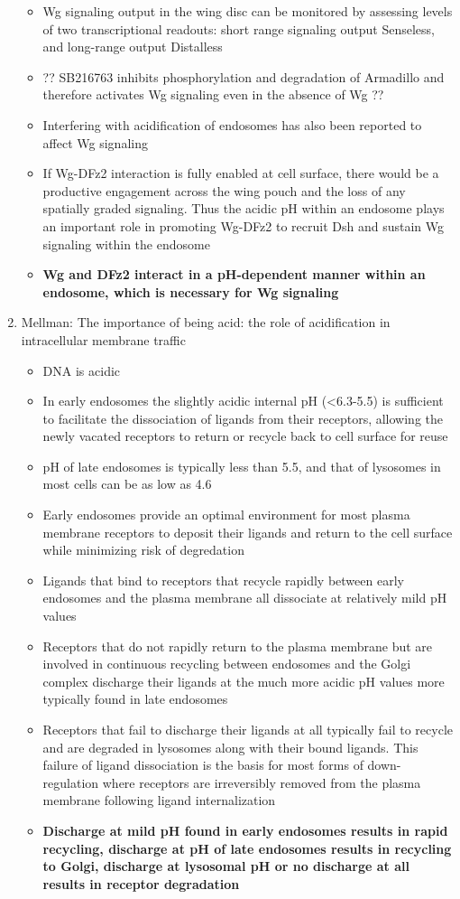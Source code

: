\documentclass[12pt]{article}
\begin{document}
\begin{enumerate}
\begin{itemize}
	\item Wg signaling output in the wing disc can be monitored by assessing levels of two transcriptional readouts: short range signaling output Senseless, and long-range output Distalless
	\item ?? SB216763 inhibits phosphorylation and degradation of Armadillo and therefore activates Wg signaling even in the absence of Wg ??
	\item Interfering with acidification of endosomes has also been reported to affect Wg signaling
	\item If Wg-DFz2 interaction is fully enabled at cell surface, there would be a productive engagement across the wing pouch and the loss of any spatially graded signaling. Thus the acidic pH within an endosome plays an important role in promoting Wg-DFz2 to
			recruit Dsh and sustain Wg signaling within the endosome
	\item \textbf{Wg and DFz2 interact in a pH-dependent manner within an endosome, which is necessary for Wg signaling}
\end{itemize}

\item Mellman: The importance of being acid: the role of acidification in intracellular membrane traffic
\begin{itemize}
	\item DNA is acidic
	\item In early endosomes the slightly acidic internal pH (<6.3-5.5) is sufficient to facilitate the dissociation of ligands from their receptors, allowing the newly vacated receptors to return or recycle back to cell surface for reuse
	\item pH of late endosomes is typically less than 5.5, and that of lysosomes in most cells can be as low as 4.6
	\item Early endosomes provide an optimal environment for most plasma membrane receptors to deposit their ligands and return to the cell surface while minimizing risk of degredation
	\item Ligands that bind to receptors that recycle rapidly between early endosomes and the plasma membrane all dissociate at relatively mild pH values
	\item Receptors that do not rapidly return to the plasma membrane but are involved in continuous recycling between endosomes and the Golgi complex discharge their ligands at the much more acidic pH values more typically found in late endosomes
	\item Receptors that fail to discharge their ligands at all typically fail to recycle and are degraded in lysosomes along with their bound ligands. This failure of ligand dissociation is the basis for most forms of down-regulation where receptors are irreversibly removed from the plasma membrane following ligand internalization
	\item \textbf{Discharge at mild pH found in early endosomes results in rapid recycling, discharge at pH of late endosomes results in recycling to Golgi, discharge at lysosomal pH or no discharge at all results in receptor degradation}
\end{itemize}
\end{enumerate}
\end{document}
